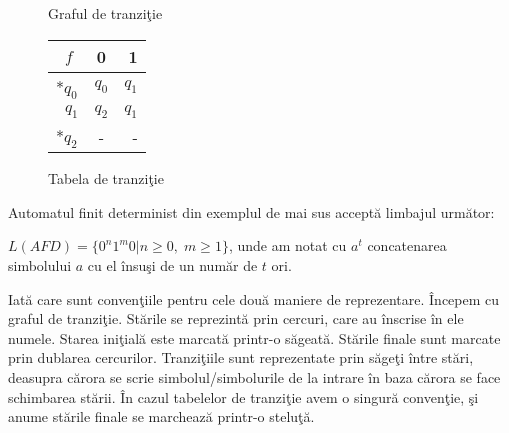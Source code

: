 \begin{figure}[H]
\centering
{}
\caption{Graful de tranziţie}
\end{figure}

\begin{figure}[H]
\centering
\begin{tabular}{ l | c r }
      $\;\;f$     &            0 &            1\\
   \hline
  *$q_{0}$    & $q_{0}$ & $q_{1}$\\
  $\;\;q_{1}$ & $q_{2}$ & $q_{1}$\\
  *$q_{2}$    &            -  &             -\\
\end{tabular}
\caption{Tabela de tranziţie}
\end{figure}

Automatul finit determinist din exemplul de mai sus acceptă limbajul următor:

$L(AFD) = \{ 0^{n}1^{m}0 | n \geq 0, \; m \geq 1 \}$, unde am notat cu $a^{t}$ concatenarea simbolului $a$ cu el însuşi de un număr de $t$ ori.

Iată care sunt convenţiile pentru cele două maniere de reprezentare. Începem cu graful de tranziţie. Stările se reprezintă prin cercuri, care au înscrise în ele numele. Starea iniţială este marcată printr-o săgeată. Stările finale sunt marcate prin dublarea cercurilor. Tranziţiile sunt reprezentate prin săgeţi între stări, deasupra cărora se scrie simbolul/simbolurile de la intrare în baza cărora se face schimbarea stării. În cazul tabelelor de tranziţie avem o singură convenţie, şi anume stările finale se marchează printr-o steluţă.

